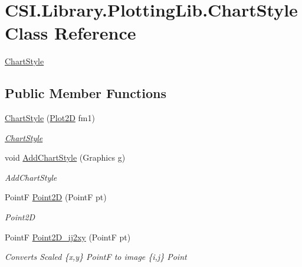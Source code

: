 \hypertarget{class_c_s_i_1_1_library_1_1_plotting_lib_1_1_chart_style}{}\section{C\+S\+I.\+Library.\+Plotting\+Lib.\+Chart\+Style Class Reference}
\label{class_c_s_i_1_1_library_1_1_plotting_lib_1_1_chart_style}


\mbox{\hyperlink{class_c_s_i_1_1_library_1_1_plotting_lib_1_1_chart_style}{Chart\+Style}}  


\subsection*{Public Member Functions}
\begin{DoxyCompactItemize}
\item 
\mbox{\hyperlink{class_c_s_i_1_1_library_1_1_plotting_lib_1_1_chart_style_a45e4d0b7896af76bd91e54777a4f3299}{Chart\+Style}} (\mbox{\hyperlink{class_c_s_i_1_1_library_1_1_plotting_lib_1_1_plot2_d}{Plot2D}} fm1)
\begin{DoxyCompactList}\small\item\em \mbox{\hyperlink{class_c_s_i_1_1_library_1_1_plotting_lib_1_1_chart_style}{Chart\+Style}} \end{DoxyCompactList}\item 
void \mbox{\hyperlink{class_c_s_i_1_1_library_1_1_plotting_lib_1_1_chart_style_af708fb50f01c74bb098e019c1e962089}{Add\+Chart\+Style}} (Graphics g)
\begin{DoxyCompactList}\small\item\em Add\+Chart\+Style \end{DoxyCompactList}\item 
PointF \mbox{\hyperlink{class_c_s_i_1_1_library_1_1_plotting_lib_1_1_chart_style_a12ac8de32ef8c74085f23b1f0951c147}{Point2D}} (PointF pt)
\begin{DoxyCompactList}\small\item\em Point2D \end{DoxyCompactList}\item 
PointF \mbox{\hyperlink{class_c_s_i_1_1_library_1_1_plotting_lib_1_1_chart_style_a9ac2e4362d1ccfd8aeecacf233db5f73}{Point2\+D\+\_\+ij2xy}} (PointF pt)
\begin{DoxyCompactList}\small\item\em Converts Scaled \{x,y\} PointF to image \{i,j\} Point \end{DoxyCompactList}\end{DoxyCompactItemize}
